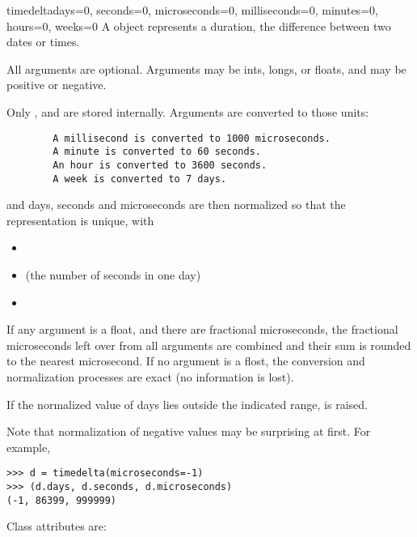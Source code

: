 \begin{classdesc}{timedelta}{days=0, seconds=0, microseconds=0,
                            milliseconds=0, minutes=0, hours=0, weeks=0}
A  object represents a duration, the difference
between two dates or times.

    All arguments are optional.  Arguments may be ints, longs, or floats,
    and may be positive or negative.

    Only ,  and  are stored
    internally.  Arguments are converted to those units:

\begin{verbatim}
        A millisecond is converted to 1000 microseconds.
        A minute is converted to 60 seconds.
        An hour is converted to 3600 seconds.
        A week is converted to 7 days.
\end{verbatim}

    and days, seconds and microseconds are then normalized so that the
    representation is unique, with

\begin{itemize}
  \item {}
  \item {} (the number of seconds in one day)
  \item {}
\end{itemize}

    If any argument is a float, and there are fractional microseconds,
    the fractional microseconds left over from all arguments are combined
    and their sum is rounded to the nearest microsecond.  If no
    argument is a flost, the conversion and normalization processes
    are exact (no information is lost).

    If the normalized value of days lies outside the indicated range,
     is raised.

    Note that normalization of negative values may be surprising at first.
    For example,

\begin{verbatim}
>>> d = timedelta(microseconds=-1)
>>> (d.days, d.seconds, d.microseconds)
(-1, 86399, 999999)
\end{verbatim}

\end{classdesc}

Class attributes are:

